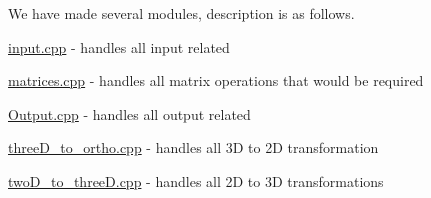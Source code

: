 We have made several modules, description is as follows.
\begin{DoxyItemize}
\item \hyperlink{input_8cpp}{input.\+cpp} -\/ handles all input related
\item \hyperlink{matrices_8cpp}{matrices.\+cpp} -\/ handles all matrix operations that would be required
\item \hyperlink{Output_8cpp}{Output.\+cpp} -\/ handles all output related
\item \hyperlink{threeD__to__ortho_8cpp}{three\+D\+\_\+to\+\_\+ortho.\+cpp} -\/ handles all 3D to 2D transformation
\item \hyperlink{twoD__to__threeD_8cpp}{two\+D\+\_\+to\+\_\+three\+D.\+cpp} -\/ handles all 2D to 3D transformations 
\end{DoxyItemize}